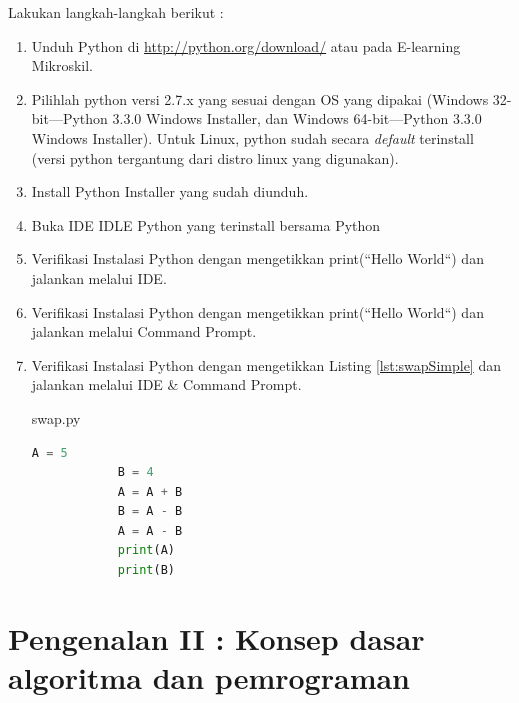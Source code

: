\begin{pemrograman}
Lakukan langkah-langkah berikut :
\begin{enumerate}
	\item Unduh Python di \url{http://python.org/download/} atau pada E-learning Mikroskil.
	\item Pilihlah python versi 2.7.x yang sesuai dengan OS yang dipakai (Windows 32-bit---Python 3.3.0 Windows Installer, dan Windows 64-bit---Python 3.3.0 Windows Installer). Untuk Linux, python sudah secara \textit{default} terinstall (versi python tergantung dari distro linux yang digunakan).
	\item Install Python Installer yang sudah diunduh.
	\item Buka IDE IDLE Python yang terinstall bersama Python	%
	\item Verifikasi Instalasi Python dengan mengetikkan print(``Hello World``) dan jalankan melalui IDE.
	\item Verifikasi Instalasi Python dengan mengetikkan print(``Hello World``) dan jalankan melalui Command Prompt.
	\item Verifikasi Instalasi Python dengan mengetikkan Listing \ref{lst:swapSimple} dan jalankan melalui IDE \& Command Prompt.
		\begin{listprog}{swap.py}
		\label{lst:swapSimple}
		\begin{lstlisting}[language=Python]
			A = 5
			B = 4
			A = A + B
			B = A - B
			A = A - B
			print(A)
			print(B)
		\end{lstlisting}
\end{listprog}
\end{enumerate}
\end{pemrograman}



\newpage
\chapter{Pengenalan II : Konsep dasar algoritma dan pemrograman}\label{ch:pengantarAlgoritma2}


